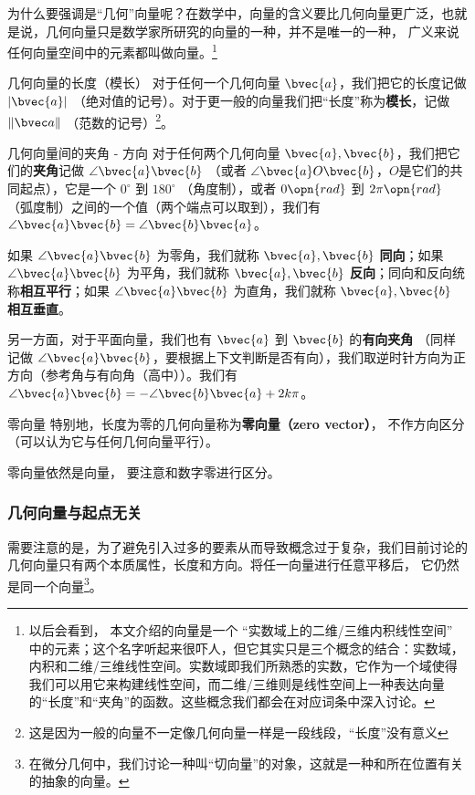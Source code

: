 为什么要强调是“几何”向量呢？在数学中，向量的含义要比几何向量更广泛，也就是说，几何向量只是数学家所研究的向量的一种，并不是唯一的一种， 广义来说任何向量空间中的元素都叫做向量。\footnote{以后会看到， 本文介绍的向量是一个 “实数域上的二维/三维内积线性空间” 中的元素；这个名字听起来很吓人，但它其实只是三个概念的结合：实数域，内积和二维/三维线性空间。实数域即我们所熟悉的实数，它作为一个域使得我们可以用它来构建线性空间，而二维/三维则是线性空间上一种表达向量的“长度”和“夹角”的函数。这些概念我们都会在对应词条中深入讨论。}

\begin{definition}{几何向量的长度（模长）}
对于任何一个几何向量 $\bvec{a}$，我们把它的长度记做 $|\bvec{a}|$ （绝对值的记号）。对于更一般的向量我们把“长度”称为\textbf{模长}，记做 $\|\bvec a\|$ （范数的记号）\footnote{这是因为一般的向量不一定像几何向量一样是一段线段，“长度”没有意义}。
\end{definition}


\begin{definition}{几何向量间的夹角 - 方向}
对于任何两个几何向量 $\bvec{a}, \bvec{b}$，我们把它们的\textbf{夹角}记做 $\angle \bvec{a} \bvec{b}$ （或者 $\angle \bvec{a} O \bvec{b}$，$O$是它们的共同起点），它是一个 $0^{\circ}$ 到 $180^{\circ}$ （角度制），或者 $0 \opn{rad}$ 到 $2 \pi \opn{rad}$ （弧度制）之间的一个值（两个端点可以取到），我们有 $\angle \bvec{a} \bvec{b} = \angle \bvec{b} \bvec{a}$。

如果 $\angle \bvec{a} \bvec{b}$ 为零角，我们就称 $\bvec{a}, \bvec{b}$ \textbf{同向}；如果 $\angle \bvec{a} \bvec{b}$ 为平角，我们就称 $\bvec{a}, \bvec{b}$ \textbf{反向}；同向和反向统称\textbf{相互平行}；如果 $\angle \bvec{a} \bvec{b}$ 为直角，我们就称 $\bvec{a}, \bvec{b}$ \textbf{相互垂直}。

另一方面，对于平面向量，我们也有 $\bvec{a}$ 到 $\bvec{b}$ 的\textbf{有向夹角} （同样记做 $\angle \bvec{a} \bvec{b}$，要根据上下文判断是否有向），我们取逆时针方向为正方向（参考角与有向角（高中））。我们有 $\angle \bvec{a} \bvec{b} = - \angle \bvec{b} \bvec{a} + 2 k \pi$。
\end{definition}

\begin{definition}{零向量}
特别地，长度为零的几何向量称为\textbf{零向量（zero vector）}， 不作方向区分（可以认为它与任何几何向量平行）。
\end{definition}
零向量依然是向量， 要注意和数字零进行区分。

\subsubsection{几何向量与起点无关}
需要注意的是，为了避免引入过多的要素从而导致概念过于复杂，我们目前讨论的几何向量只有两个本质属性，长度和方向。将任一向量进行任意平移后， 它仍然是同一个向量\footnote{在微分几何中，我们讨论一种叫“切向量”的对象，这就是一种和所在位置有关的抽象的向量。}。

